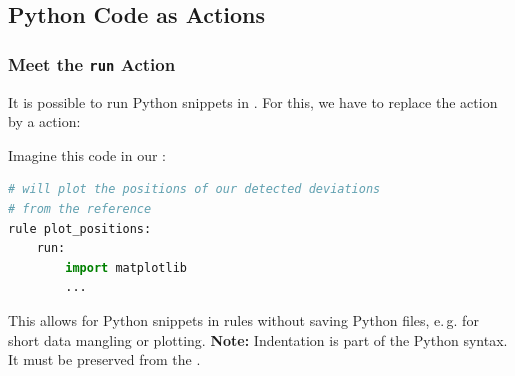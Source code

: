 \subsection{Python Code as Actions}

\begin{frame}[fragile]
  \frametitle{Meet the \texttt{run} Action}
  \vspace{-0.5em}
  It is possible to run Python snippets in \Snakemake{}. For this, we have to replace the  action by a  action:\vspace{-0.5em}
  \begin{task}
  	Imagine this code in our :
  \end{task}\vspace{-0.5em}
  \begin{lstlisting}[language=Python,style=Python, basicstyle=\footnotesize]
# will plot the positions of our detected deviations
# from the reference
rule plot_positions:
    run:
        import matplotlib
        ...
  \end{lstlisting}
  \vspace{-0.5em}
  \pause\footnotesize
  \begin{hint}
     This allows for Python snippets in rules without saving Python files, e.\,g. for short data mangling or plotting.\newline
     \textbf{Note:} Indentation is part of the Python syntax. It must be preserved from the .
  \end{hint}
\end{frame}

